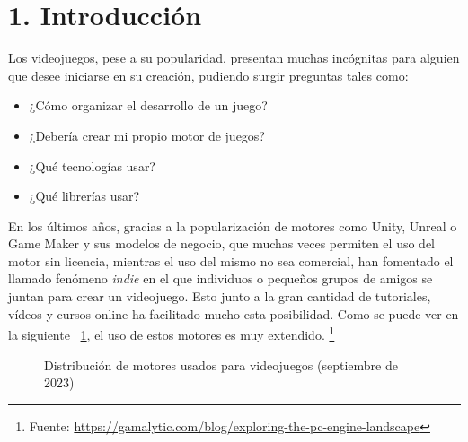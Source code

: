 \chapter*{1. Introducción}\label{cap:intro}

Los videojuegos, pese a su popularidad, presentan muchas incógnitas para alguien que desee iniciarse en su creación, 
pudiendo surgir preguntas tales como:
\begin{itemize}
    \item ¿Cómo organizar el desarrollo de un juego?
    \item ¿Debería crear mi propio motor de juegos?
    \item ¿Qué tecnologías usar?
    \item ¿Qué librerías usar?
\end{itemize}
En los últimos años, gracias a la popularización de motores como Unity\cite{unity}, Unreal\cite{unreal} o
Game Maker\cite{gamemaker} y sus modelos de negocio, que muchas veces permiten el uso del motor sin licencia, mientras el uso
del mismo no sea comercial\cite{unity-pricing}\cite{unreal-pricing}\cite{gamemaker-pricing}, han fomentado el llamado fenómeno \textit{indie} en el que individuos o pequeños grupos de
amigos se juntan para crear un videojuego. Esto junto a la gran cantidad de tutoriales, vídeos y cursos online
ha facilitado mucho esta posibilidad. Como se puede ver en la siguiente \figurename~\ref{engine_distribution}, el uso de estos motores es muy extendido. \footnote{Fuente: \url{https://gamalytic.com/blog/exploring-the-pc-engine-landscape}}

\begin{figure}[h!]
    \centering
    
    
    \caption{Distribución de motores usados para videojuegos (septiembre de 2023)}
    \label{engine_distribution}
\end{figure}

